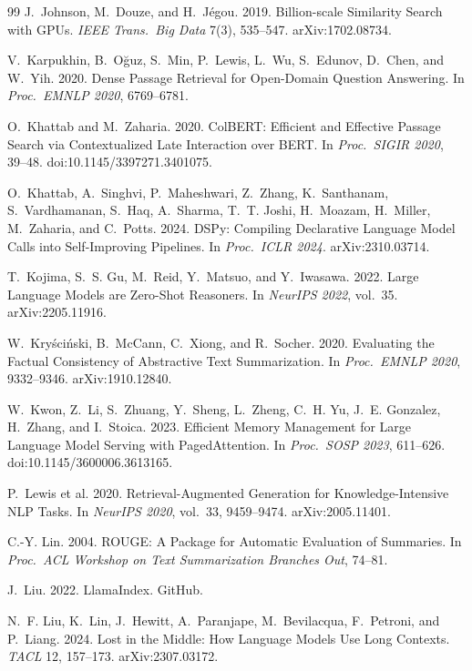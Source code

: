 \documentclass[sigconf,review,anonymous]{acmart}
\begin{document}
\begin{thebibliography}{99}
J.~Johnson, M.~Douze, and H.~J\'egou. 2019. Billion-scale Similarity Search with
GPUs. \emph{IEEE Trans.\ Big Data} 7(3), 535--547. arXiv:1702.08734.

V.~Karpukhin, B.~O\u{g}uz, S.~Min, P.~Lewis, L.~Wu, S.~Edunov, D.~Chen, and
W.~Yih. 2020. Dense Passage Retrieval for Open-Domain Question Answering.
In \emph{Proc.\ EMNLP 2020}, 6769--6781.

O.~Khattab and M.~Zaharia. 2020. ColBERT: Efficient and Effective Passage Search
via Contextualized Late Interaction over BERT. In \emph{Proc.\ SIGIR 2020},
39--48. doi:10.1145/3397271.3401075.

O.~Khattab, A.~Singhvi, P.~Maheshwari, Z.~Zhang, K.~Santhanam, S.~Vardhamanan,
S.~Haq, A.~Sharma, T.~T. Joshi, H.~Moazam, H.~Miller, M.~Zaharia, and C.~Potts.
2024. DSPy: Compiling Declarative Language Model Calls into Self-Improving
Pipelines. In \emph{Proc.\ ICLR 2024}. arXiv:2310.03714.

T.~Kojima, S.~S. Gu, M.~Reid, Y.~Matsuo, and Y.~Iwasawa. 2022. Large Language
Models are Zero-Shot Reasoners. In \emph{NeurIPS 2022}, vol.~35. arXiv:2205.11916.

W.~Kry\'sci\'nski, B.~McCann, C.~Xiong, and R.~Socher. 2020. Evaluating the
Factual Consistency of Abstractive Text Summarization. In \emph{Proc.\ EMNLP
2020}, 9332--9346. arXiv:1910.12840.

W.~Kwon, Z.~Li, S.~Zhuang, Y.~Sheng, L.~Zheng, C.~H. Yu, J.~E. Gonzalez,
H.~Zhang, and I.~Stoica. 2023. Efficient Memory Management for Large Language
Model Serving with PagedAttention. In \emph{Proc.\ SOSP 2023}, 611--626.
doi:10.1145/3600006.3613165.

P.~Lewis et al. 2020. Retrieval-Augmented Generation for Knowledge-Intensive NLP
Tasks. In \emph{NeurIPS 2020}, vol.~33, 9459--9474. arXiv:2005.11401.

C.-Y. Lin. 2004. ROUGE: A Package for Automatic Evaluation of Summaries. In
\emph{Proc.\ ACL Workshop on Text Summarization Branches Out}, 74--81.

J.~Liu. 2022. LlamaIndex. GitHub.

N.~F. Liu, K.~Lin, J.~Hewitt, A.~Paranjape, M.~Bevilacqua, F.~Petroni, and
P.~Liang. 2024. Lost in the Middle: How Language Models Use Long Contexts.
\emph{TACL} 12, 157--173. arXiv:2307.03172.


\end{thebibliography}
\end{document}
